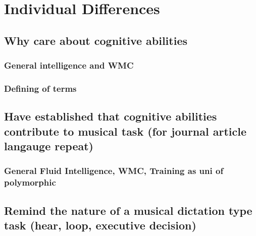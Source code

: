 \documentclass[]{book}
\theoremstyle{definition}
\theoremstyle{definition}
\theoremstyle{definition}
\theoremstyle{remark}
\begin{document}
\hypertarget{individual-differences}{%
\chapter{Individual Differences}\label{individual-differences}}

\hypertarget{why-care-about-cognitive-abilities}{%
\section{Why care about cognitive
abilities}\label{why-care-about-cognitive-abilities}}

\hypertarget{general-intelligence-and-wmc}{%
\subsection{General intelligence and
WMC}\label{general-intelligence-and-wmc}}

\hypertarget{defining-of-terms}{%
\subsection{Defining of terms}\label{defining-of-terms}}

\hypertarget{have-established-that-cognitive-abilities-contribute-to-musical-task-for-journal-article-langauge-repeat}{%
\section{Have established that cognitive abilities contribute to musical
task (for journal article langauge
repeat)}\label{have-established-that-cognitive-abilities-contribute-to-musical-task-for-journal-article-langauge-repeat}}

\hypertarget{general-fluid-intelligence-wmc-training-as-uni-of-polymorphic}{%
\subsection{General Fluid Intelligence, WMC, Training as uni of
polymorphic}\label{general-fluid-intelligence-wmc-training-as-uni-of-polymorphic}}

\hypertarget{remind-the-nature-of-a-musical-dictation-type-task-hear-loop-executive-decision}{%
\section{Remind the nature of a musical dictation type task (hear, loop,
executive
decision)}\label{remind-the-nature-of-a-musical-dictation-type-task-hear-loop-executive-decision}}
\end{document}
